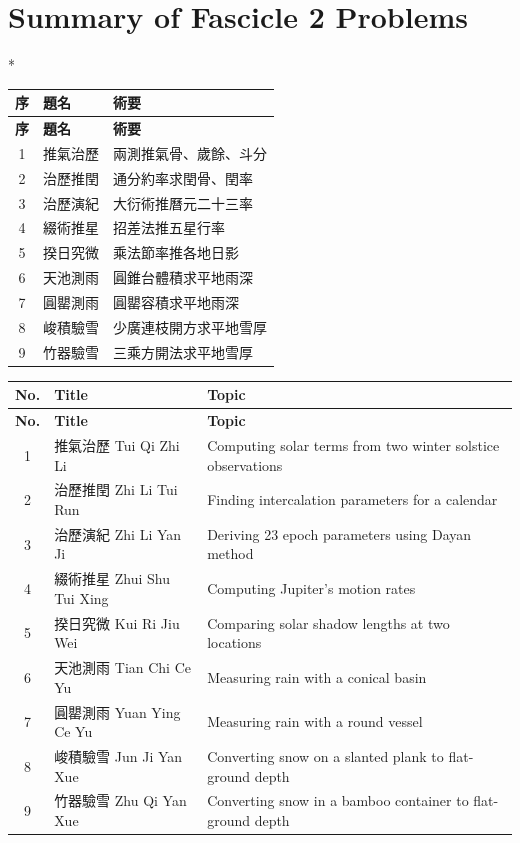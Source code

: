 \documentclass[11pt,a4paper]{article}
\begin{document}
\switchcolumn[1]
\section*{Summary of Fascicle 2 Problems}

\vspace{1em}

\switchcolumn[0]*
\begin{longtable}{|c|l|p{5cm}|}
\hline
\textbf{序} & \textbf{題名} & \textbf{術要} \\
\hline
\endfirsthead
\hline
\textbf{序} & \textbf{題名} & \textbf{術要} \\
\hline
\endhead
1 & 推氣治歷 & 兩測推氣骨、歲餘、斗分 \\
\hline
2 & 治歷推閏 & 通分約率求閏骨、閏率 \\
\hline
3 & 治歷演紀 & 大衍術推曆元二十三率 \\
\hline
4 & 綴術推星 & 招差法推五星行率 \\
\hline
5 & 揆日究微 & 乘法節率推各地日影 \\
\hline
6 & 天池測雨 & 圓錐台體積求平地雨深 \\
\hline
7 & 圓罌測雨 & 圓罌容積求平地雨深 \\
\hline
8 & 峻積驗雪 & 少廣連枝開方求平地雪厚 \\
\hline
9 & 竹器驗雪 & 三乘方開法求平地雪厚 \\
\hline
\end{longtable}

\switchcolumn[1]
\begin{longtable}{|c|l|p{5.5cm}|}
\hline
\textbf{No.} & \textbf{Title} & \textbf{Topic} \\
\hline
\endfirsthead
\hline
\textbf{No.} & \textbf{Title} & \textbf{Topic} \\
\hline
\endhead
1 & 推氣治歷 Tui Qi Zhi Li & Computing solar terms from two winter solstice observations \\
\hline
2 & 治歷推閏 Zhi Li Tui Run & Finding intercalation parameters for a calendar \\
\hline
3 & 治歷演紀 Zhi Li Yan Ji & Deriving 23 epoch parameters using Dayan method \\
\hline
4 & 綴術推星 Zhui Shu Tui Xing & Computing Jupiter's motion rates \\
\hline
5 & 揆日究微 Kui Ri Jiu Wei & Comparing solar shadow lengths at two locations \\
\hline
6 & 天池測雨 Tian Chi Ce Yu & Measuring rain with a conical basin \\
\hline
7 & 圓罌測雨 Yuan Ying Ce Yu & Measuring rain with a round vessel \\
\hline
8 & 峻積驗雪 Jun Ji Yan Xue & Converting snow on a slanted plank to flat-ground depth \\
\hline
9 & 竹器驗雪 Zhu Qi Yan Xue & Converting snow in a bamboo container to flat-ground depth \\
\hline
\end{longtable}
\end{document}

